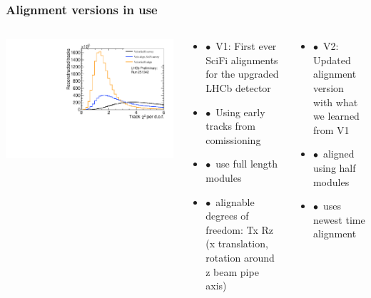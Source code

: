 \documentclass[aspectratio=1610, 12pt, xcolor=dvipsnames]{beamer}
\begin{document}
\begin{frame}\frametitle{Alignment versions in use}
  \begin{columns}
    \begin{column}[c]{0.33\textwidth}
      \centering
      \includegraphics[width=\textwidth]{logos/LHCb-FIGURE-2022-018/Run251342Preliminary_BestLong_chi2_per_ndof.pdf}
    \end{column}
    \begin{column}[c]{0.33\textwidth}
      \begin{itemize}
        \item $\bullet$\, V1: First ever SciFi alignments for the upgraded LHCb detector
	\item $\bullet$\, Using early tracks from comissioning
        \item $\bullet$\, use full length modules
        \item $\bullet$\, alignable degrees of freedom: Tx Rz (x translation, rotation around z \to beam pipe axis)
      \end{itemize}
    \end{column}
    \begin{column}[c]{0.33\textwidth}
      \begin{itemize}
        \item $\bullet$\, V2: Updated alignment version with what we learned from V1 %
        \item $\bullet$\, aligned using half modules
        \item $\bullet$\, uses newest time alignment
      \end{itemize}
    \end{column}
  \end{columns}
\end{frame}
\end{document}
